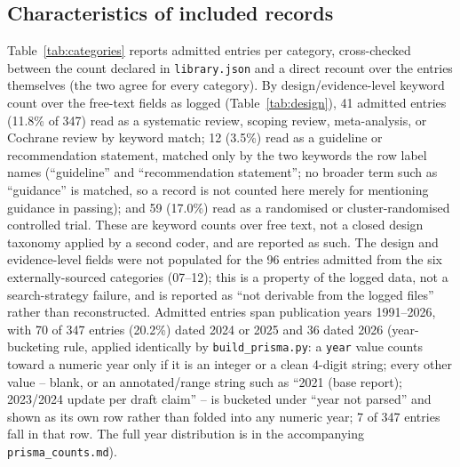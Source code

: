 \documentclass[11pt]{article}
\begin{document}
\subsection{Characteristics of included records}
Table~\ref{tab:categories} reports admitted entries per category, cross-checked between the count
declared in \texttt{library.json} and a direct recount over the entries themselves (the two agree
for every category). By design/evidence-level keyword count over the free-text fields as logged
(Table~\ref{tab:design}), 41 admitted entries (11.8\% of 347) read as a systematic review, scoping
review, meta-analysis, or Cochrane review by keyword match; 12 (3.5\%) read as a guideline or
recommendation statement, matched only by the two keywords the row label names (``guideline'' and
``recommendation statement''; no broader term such as ``guidance'' is matched, so a record is not
counted here merely for mentioning guidance in passing); and 59 (17.0\%) read as a randomised or
cluster-randomised controlled
trial. These are keyword counts over free text, not a closed design taxonomy applied by a second
coder, and are reported as such. The design and evidence-level fields were not populated for the
96 entries admitted from the six externally-sourced categories (07--12); this is a property of the
logged data, not a search-strategy failure, and is reported as ``not derivable from the logged
files'' rather than reconstructed. Admitted entries span publication years 1991--2026, with 70 of
347 entries (20.2\%) dated 2024 or 2025 and 36 dated 2026 (year-bucketing rule, applied
identically by \texttt{build\_prisma.py}: a \texttt{year} value counts toward a numeric year only
if it is an integer or a clean 4-digit string; every other value -- blank, or an annotated/range
string such as ``2021 (base report); 2023/2024 update per draft claim'' -- is bucketed under
``year not parsed'' and shown as its own row rather than folded into any numeric year; 7 of 347
entries fall in that row. The full year distribution is in the accompanying
\texttt{prisma\_counts.md}).
\end{document}
